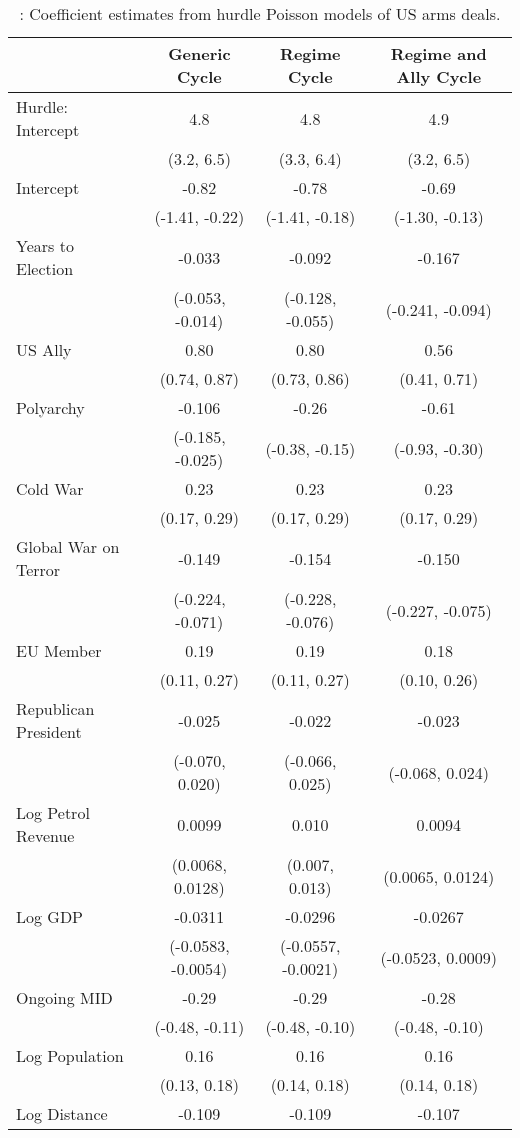 
\begin{longtable}[t]{lccc}
\caption{\label{tab:pois-regs}: Coefficient estimates from hurdle Poisson models of US arms deals.}\\
\toprule
  & Generic Cycle & Regime Cycle & Regime and Ally Cycle\\
\midrule
Hurdle: Intercept & 4.8 & 4.8 & 4.9\\
 & (3.2, 6.5) & (3.3, 6.4) & (3.2, 6.5)\\
Intercept & -0.82 & -0.78 & -0.69\\
 & (-1.41, -0.22) & (-1.41, -0.18) & (-1.30, -0.13)\\
Years to Election & -0.033 & -0.092 & -0.167\\
 & (-0.053, -0.014) & (-0.128, -0.055) & (-0.241, -0.094)\\
US Ally & 0.80 & 0.80 & 0.56\\
 & (0.74, 0.87) & (0.73, 0.86) & (0.41, 0.71)\\
Polyarchy & -0.106 & -0.26 & -0.61\\
 & (-0.185, -0.025) & (-0.38, -0.15) & (-0.93, -0.30)\\
Cold War & 0.23 & 0.23 & 0.23\\
 & (0.17, 0.29) & (0.17, 0.29) & (0.17, 0.29)\\
Global War on Terror & -0.149 & -0.154 & -0.150\\
 & (-0.224, -0.071) & (-0.228, -0.076) & (-0.227, -0.075)\\
EU Member & 0.19 & 0.19 & 0.18\\
 & (0.11, 0.27) & (0.11, 0.27) & (0.10, 0.26)\\
Republican President & -0.025 & -0.022 & -0.023\\
 & (-0.070, 0.020) & (-0.066, 0.025) & (-0.068, 0.024)\\
Log Petrol Revenue & 0.0099 & 0.010 & 0.0094\\
 & (0.0068, 0.0128) & (0.007, 0.013) & (0.0065, 0.0124)\\
Log GDP & -0.0311 & -0.0296 & -0.0267\\
 & (-0.0583, -0.0054) & (-0.0557, -0.0021) & (-0.0523, 0.0009)\\
Ongoing MID & -0.29 & -0.29 & -0.28\\
 & (-0.48, -0.11) & (-0.48, -0.10) & (-0.48, -0.10)\\
Log Population & 0.16 & 0.16 & 0.16\\
 & (0.13, 0.18) & (0.14, 0.18) & (0.14, 0.18)\\
Log Distance & -0.109 & -0.109 & -0.107\\

\end{longtable}
